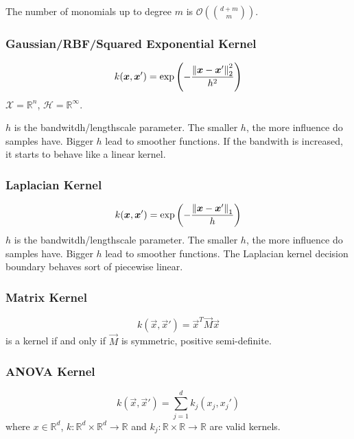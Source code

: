 The number of monomials up to degree $m$ is
$\mathcal{O}(\binom{d+m}{m})$.

\subsubsection{Gaussian/RBF/Squared Exponential Kernel}
\begin{equation*}
    k(\boldsymbol{x}, \boldsymbol{x}') = \exp\left(
        -\frac{\left\lVert\boldsymbol{x} - \boldsymbol{x}'\right\rVert_2^2}{h^2}
    \right)
\end{equation*}
$\mathcal{X} = \mathbb{R}^n$,
$\mathcal{H} = \mathbb{R}^\infty$.

$h$ is the bandwitdh/lengthscale parameter.
The smaller $h$, the more influence do samples have.
Bigger $h$ lead to smoother functions.
If the bandwith is increased,
it starts to behave like a linear kernel.

\subsubsection{Laplacian Kernel}
\begin{equation*}
    k(\boldsymbol{x}, \boldsymbol{x}') = \exp\left(
        -\frac{\left\lVert\boldsymbol{x} - \boldsymbol{x}'\right\rVert_1}{h}
    \right)
\end{equation*}
$h$ is the bandwitdh/lengthscale parameter.
The smaller $h$, the more influence do samples have.
Bigger $h$ lead to smoother functions.
The Laplacian kernel decision boundary behaves
sort of piecewise linear.


\subsubsection{Matrix Kernel}
\begin{equation*}
    k(\vec{x}, \vec{x}') = \vec{x}^T \vec{M} \vec{x}
\end{equation*}
is a kernel if and only if $\vec{M}$ is
symmetric, positive semi-definite.

\subsubsection{ANOVA Kernel}
\begin{equation*}
    k(\vec{x}, \vec{x}') = 
    \sum_{j=1}^d{
        k_j(x_j, x_j')
    }
\end{equation*}
where $x \in \mathbb{R}^d$,
$k : \mathbb{R}^d \times \mathbb{R}^d \to \mathbb{R}$ and
$k_j : \mathbb{R} \times \mathbb{R} \to \mathbb{R}$
are valid kernels.

